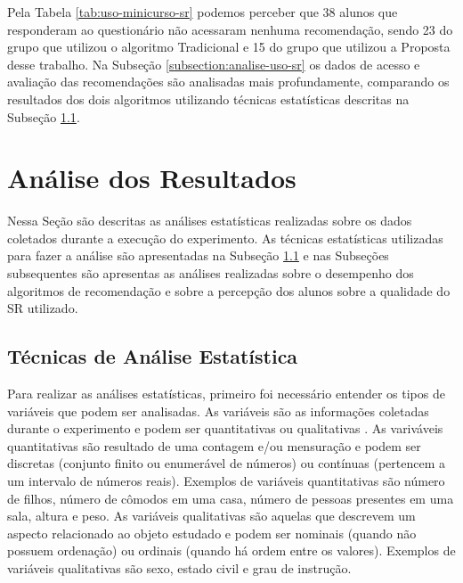 Pela Tabela \ref{tab:uso-minicurso-sr} podemos perceber que 38 alunos que responderam ao questionário não acessaram nenhuma
recomendação, sendo 23 do grupo que utilizou o algoritmo Tradicional e 15 do grupo que utilizou a Proposta desse
trabalho. Na Subseção \ref{subsection:analise-uso-sr} os dados de acesso e avaliação das recomendações são analisadas mais profundamente,
comparando os resultados dos dois algoritmos utilizando técnicas estatísticas descritas na Subseção \ref{subsection:tecnicas-analise-estatistica}.

\section{Análise dos Resultados}\label{section:analise-experimento}

Nessa Seção são descritas as análises estatísticas realizadas sobre os dados coletados durante a execução do experimento.
As técnicas estatísticas utilizadas para fazer a análise são apresentadas na Subseção \ref{subsection:tecnicas-analise-estatistica}
e nas Subseções subsequentes são apresentas as análises realizadas sobre o desempenho dos algoritmos de recomendação e sobre
a percepção dos alunos sobre a qualidade do SR utilizado.

\subsection{Técnicas de Análise Estatística}\label{subsection:tecnicas-analise-estatistica}

Para realizar as análises estatísticas, primeiro foi necessário entender os tipos de variáveis que podem ser analisadas.
As variáveis são as informações coletadas durante o experimento e podem ser quantitativas ou qualitativas \cite{bussab2012morettin}.
As variváveis quantitativas são resultado de uma contagem e/ou mensuração \cite{bussab2012morettin} e podem ser discretas
(conjunto finito ou enumerável de números) ou contínuas (pertencem a um intervalo de números reais). Exemplos de variáveis
quantitativas são número de filhos, número de cômodos em uma casa, número de pessoas presentes em uma sala, altura e peso.
As variáveis qualitativas são aquelas que descrevem um aspecto relacionado ao objeto estudado \cite{bussab2012morettin} e podem ser
nominais (quando não possuem ordenação) ou ordinais (quando há ordem entre os valores). Exemplos de variáveis qualitativas
são sexo, estado civil e grau de instrução.

